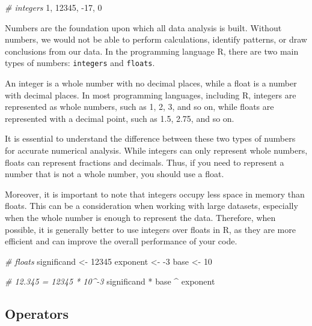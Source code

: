 \documentclass[
]{book}
\newenvironment{Shaded}{\begin{snugshade}}{\end{snugshade}}
\newcommand{\CommentTok}[1]{\textcolor[rgb]{0.56,0.35,0.01}{\textit{#1}}}
\newcommand{\DecValTok}[1]{\textcolor[rgb]{0.00,0.00,0.81}{#1}}
\newcommand{\NormalTok}[1]{#1}
\newcommand{\OtherTok}[1]{\textcolor[rgb]{0.56,0.35,0.01}{#1}}
\newcommand{\SpecialCharTok}[1]{\textcolor[rgb]{0.00,0.00,0.00}{#1}}
\begin{document}
\begin{Shaded}
\begin{Highlighting}[]
\CommentTok{\# integers}
\DecValTok{1}\NormalTok{,  }\DecValTok{12345}\NormalTok{, }\SpecialCharTok{{-}}\DecValTok{17}\NormalTok{, }\DecValTok{0}
\end{Highlighting}
\end{Shaded}

Numbers are the foundation upon which all data analysis is built. Without numbers, we would not be able to perform calculations, identify patterns, or draw conclusions from our data. In the programming language R, there are two main types of numbers: \texttt{integers} and \texttt{floats}.

An integer is a whole number with no decimal places, while a float is a number with decimal places. In most programming languages, including R, integers are represented as whole numbers, such as 1, 2, 3, and so on, while floats are represented with a decimal point, such as 1.5, 2.75, and so on.

It is essential to understand the difference between these two types of numbers for accurate numerical analysis. While integers can only represent whole numbers, floats can represent fractions and decimals. Thus, if you need to represent a number that is not a whole number, you should use a float.

Moreover, it is important to note that integers occupy less space in memory than floats. This can be a consideration when working with large datasets, especially when the whole number is enough to represent the data. Therefore, when possible, it is generally better to use integers over floats in R, as they are more efficient and can improve the overall performance of your code.

\begin{Shaded}
\begin{Highlighting}[]
\CommentTok{\# floats}
\NormalTok{significand }\OtherTok{\textless{}{-}} \DecValTok{12345}
\NormalTok{exponent }\OtherTok{\textless{}{-}} \SpecialCharTok{{-}}\DecValTok{3}
\NormalTok{base }\OtherTok{\textless{}{-}} \DecValTok{10}

\CommentTok{\# 12.345 = 12345 * 10\^{}{-}3}
\NormalTok{significand }\SpecialCharTok{*}\NormalTok{ base }\SpecialCharTok{\^{}}\NormalTok{ exponent}
\end{Highlighting}
\end{Shaded}

\hypertarget{operators}{%
\subsection{Operators}\label{operators}}
\end{document}
